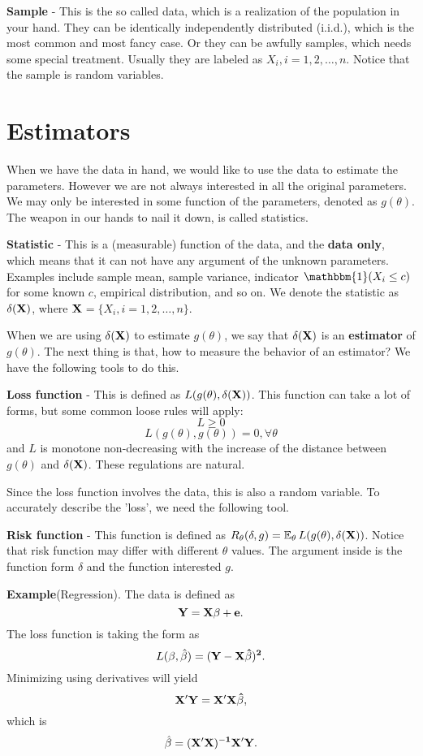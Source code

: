 \documentclass[12pt]{article}
\newcommand{\1}{\mathbbm{1}}
\newcommand{\E}{\operatorname{\mathbb{E}}}
\begin{document}
\textbf{Sample} - This is the so called data, which is a realization of the population in your hand. They can be identically independently distributed (i.i.d.), which is the most common and most fancy case. Or they can be awfully samples, which needs some special treatment. Usually they are labeled as $X_i, i = 1,2,\ldots,n$. Notice that the sample is random variables.

\section{Estimators}

When we have the data in hand, we would like to use the data to estimate the parameters. However we are not always interested in all the original parameters. We may only be interested in some function of the parameters, denoted as $g(\theta)$. The weapon in our hands to nail it down, is called statistics.

\textbf{Statistic} - This is a (measurable) function of the data, and the \textbf{data only}, which means that it can not have any argument of the unknown parameters. Examples include sample mean, sample variance, indicator $\1 (X_i \leq c)$ for some known $c$, empirical distribution, and so on. We denote the statistic as $\delta(\bf{X})$, where $\bf{X} $$= \{X_i, i = 1,2,\ldots,n \}$.

When we are using $\delta(\bf{X})$ to estimate $g( \theta )$, we say that $\delta(\bf{X})$ is an \textbf{estimator} of $g(\theta )$. The next thing is that, how to measure the behavior of an estimator? We have the following tools to do this.

\textbf{Loss function} - This is defined as $L(g(\theta),\delta(\bf{X}))$. This function can take a lot of forms, but some common loose rules will apply:
$$
L \geq 0
$$
$$
L (g(\theta), g(\theta)) = 0 ,\forall \theta
$$
and $L$ is monotone non-decreasing with the increase of the distance between $g(\theta)$ and $\delta(\bf{X})$. These regulations are natural. 

Since the loss function involves the data, this is also a random variable. To accurately describe the 'loss', we need the following tool.

\textbf{Risk function} - This function is defined as $R_\theta(\delta, g) = \E_\theta L(g(\theta),\delta(\bf{X})) $. Notice that risk function may differ with different $\theta$ values. The argument inside is the function form $\delta$ and the function interested $g$.

\textbf{Example}(Regression). The data is defined as 
$$
\bf Y = \bf X \beta + e . 
$$
The loss function is taking the form as 
$$
L (\beta, \hat \beta) = (\bf Y  - \bf X \hat \beta)^2.
$$
Minimizing using derivatives will yield
$$
\bf X ' \bf Y  = \bf X ' \bf X \hat \beta,
$$
which is
$$
\hat \beta = (\bf X ' \bf X )^{-1} \bf X ' \bf Y.
$$


\end{document}
